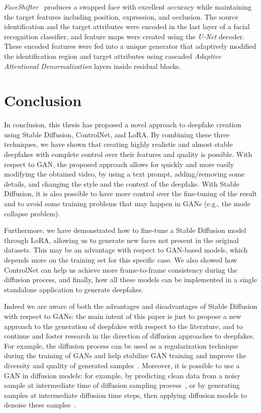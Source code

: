 \documentclass[preprint]{elsarticle}
\begin{document}
\emph{FaceShifter}~\cite{faceshifter} produces a swapped face with excellent accuracy while maintaining the target features including position, expression, and occlusion. The source identification and the target attributes were encoded in the last layer of a facial recognition classifier, and feature maps were created using the \emph{U-Net} decoder. These encoded features were fed into a unique generator that adaptively modified the identification region and target attributes using cascaded \emph{Adaptive Attentional Denormalization} layers inside residual blocks.



\section{Conclusion}\label{sect:conclusion}
In conclusion, this thesis has proposed a novel approach to deepfake creation using Stable Diffusion, ControlNet, and LoRA. By combining these three techniques, we have shown that creating highly realistic and almost stable deepfakes with complete control over their features and quality is possible. With respect to GAN, the proposed approach allows for quickly and more easily modifying the obtained video, by  using a text prompt, adding/removing some details, and changing the style  and the context of the deepfake. With Stable Diffusion, it is also possible to have more control over the fine-tuning of the result and to avoid some training problems that may happen in GANs (e.g., the mode collapse problem).

Furthermore, we have demonstrated how to fine-tune a Stable Diffusion model through LoRA,  allowing us to generate new faces not present in the original datasets. This may be an advantage with respect to GAN-based models, which depends more on the training set for this specific case. We also showed how ControlNet can help us achieve more frame-to-frame consistency during the diffusion process, and finally, how all these models can be implemented in a single standalone application to generate deepfakes. 

Indeed we are aware of both the advantages and disadvantages of Stable Diffusion with respect to GANs: the main intent of this paper is just to propose a new approach to the generation of deepfakes with respect to the literature, and to continue and foster research in the direction of diffusion approaches to deepfakes. For example, the diffusion process can be used as a regularization technique during the training of GANs and help stabilize GAN training and improve the diversity and quality of generated samples~\cite{mix}.
Moreover, it is possible to use a GAN  in diffusion models: for example, by predicting clean data from a noisy sample at intermediate time of diffusion sampling process~\cite{ganindiff1}, or by generating samples at intermediate diffusion time steps, then applying diffusion models to denoise these samples~\cite{ganindiff2}.
\end{document}
